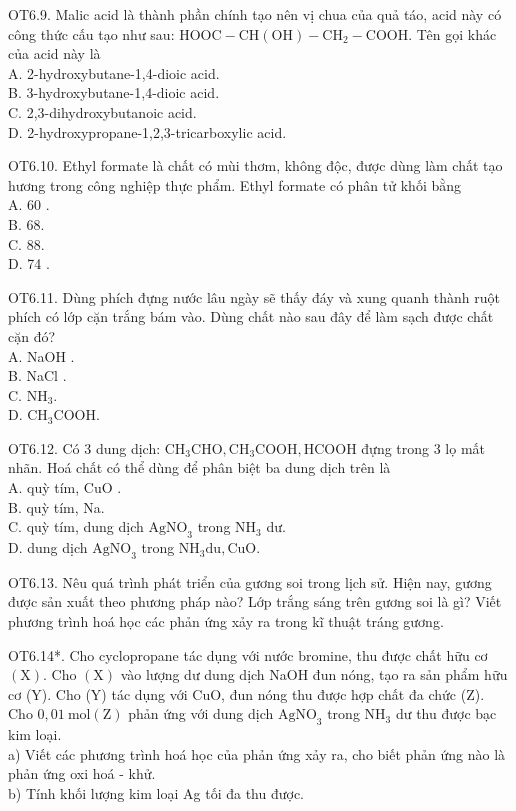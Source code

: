 \documentclass[10pt]{article}
\begin{document}
OT6.9. Malic acid là thành phần chính tạo nên vị chua của quả táo, acid này có\\
công thức cấu tạo như sau: $\mathrm{HOOC}-\mathrm{CH}(\mathrm{OH})-\mathrm{CH}_{2}-\mathrm{COOH}$. Tên gọi khác của acid này là\\
A. 2-hydroxybutane-1,4-dioic acid.\\
B. 3-hydroxybutane-1,4-dioic acid.\\
C. 2,3-dihydroxybutanoic acid.\\
D. 2-hydroxypropane-1,2,3-tricarboxylic acid.

OT6.10. Ethyl formate là chất có mùi thơm, không độc, được dùng làm chất tạo hương trong công nghiệp thực phẩm. Ethyl formate có phân tử khối bằng\\
A. 60 .\\
B. 68.\\
C. 88.\\
D. 74 .

OT6.11. Dùng phích đựng nước lâu ngày sẽ thấy đáy và xung quanh thành ruột phích có lớp cặn trắng bám vào. Dùng chất nào sau đây để làm sạch được chất cặn đó?\\
A. NaOH .\\
B. NaCl .\\
C. $\mathrm{NH}_{3}$.\\
D. $\mathrm{CH}_{3} \mathrm{COOH}$.

OT6.12. Có 3 dung dịch: $\mathrm{CH}_{3} \mathrm{CHO}, \mathrm{CH}_{3} \mathrm{COOH}, \mathrm{HCOOH}$ đựng trong 3 lọ mất nhãn. Hoá chất có thể dùng để phân biệt ba dung dịch trên là\\
A. quỳ tím, CuO .\\
B. quỳ tím, Na.\\
C. quỳ tím, dung dịch $\mathrm{AgNO}_{3}$ trong $\mathrm{NH}_{3}$ dư.\\
D. dung dịch $\mathrm{AgNO}_{3}$ trong $\mathrm{NH}_{3} \mathrm{du}, \mathrm{CuO}$.

OT6.13. Nêu quá trình phát triển của gương soi trong lịch sử. Hiện nay, gương được sản xuất theo phương pháp nào? Lớp trắng sáng trên gương soi là gì? Viết phương trình hoá học các phản ứng xảy ra trong kĩ thuật tráng gương.

OT6.14*. Cho cyclopropane tác dụng với nước bromine, thu được chất hữu cơ $(\mathrm{X})$. Cho $(\mathrm{X})$ vào lượng dư dung dịch NaOH đun nóng, tạo ra sản phẩm hữu cơ (Y). Cho (Y) tác dụng với CuO, đun nóng thu được hợp chất đa chức (Z). Cho $0,01 \mathrm{~mol}(\mathrm{Z})$ phản ứng với dung dịch $\mathrm{AgNO}_{3}$ trong $\mathrm{NH}_{3}$ dư thu được bạc kim loại.\\
a) Viết các phương trình hoá học của phản ứng xảy ra, cho biết phản ứng nào là phản ứng oxi hoá - khử.\\
b) Tính khối lượng kim loại Ag tối đa thu được.
\end{document}
